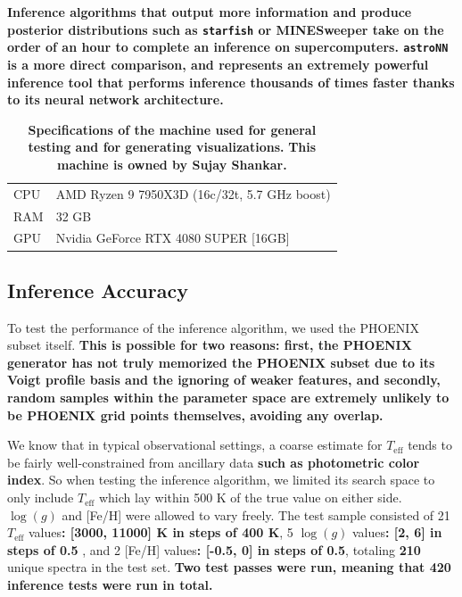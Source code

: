 \documentclass[twocolumn, linenumbers]{aastex631}
\begin{document}
\textbf{Inference algorithms that output more information and produce posterior distributions such as \texttt{starfish} \citep{starfish} or MINESweeper \citep{minesweeper} take on the order of an hour to complete an inference on supercomputers.
\texttt{astroNN} \citep{leung2019} is a more direct comparison, and represents an extremely powerful inference tool that performs inference thousands of times faster thanks to its neural network architecture.}
\begin{table}[h!]
    \centering
    \begin{tabular}{ll}
        \hline
        CPU & AMD Ryzen 9 7950X3D (16c/32t, 5.7 GHz boost)\\
        RAM & 32 GB\\
        GPU & Nvidia GeForce RTX 4080 SUPER [16GB]\\
        \hline
    \end{tabular}
    \caption{\textbf{Specifications of the machine used for general testing and for generating visualizations.}
    \textbf{This machine is owned by Sujay Shankar.}}
    \label{tab:table3}
\end{table}

\subsection{\textbf{Inference Accuracy}}
To test the performance of the inference algorithm, we used the PHOENIX subset itself.
\textbf{This is possible for two reasons: first, the PHOENIX generator has not truly memorized the PHOENIX subset due to its Voigt profile basis and the ignoring of weaker features, and secondly, random samples within the parameter space are extremely unlikely to be PHOENIX grid points themselves, avoiding any overlap.}

We know that in typical observational settings, a coarse estimate for $T_{\mathrm{eff}}$ tends to be fairly well-constrained from ancillary data \textbf{such as photometric color index}.
So when testing the inference algorithm, we limited its search space to only include $T_{\mathrm{eff}}$ which lay within 500 K of the true value on either side.
$\log(g)$ and [Fe/H] were allowed to vary freely.
The test sample consisted of 21 $T_{\mathrm{eff}}$ values\textbf{: [3000, 11000] K in steps of 400 K}, 5 $\log(g)$ values\textbf{: [2, 6] in steps of 0.5} , and 2 [Fe/H] values\textbf{: [-0.5, 0] in steps of 0.5}, totaling \textbf{210} unique spectra in the test set.
\textbf{Two test passes were run, meaning that 420 inference tests were run in total.}
\end{document}
